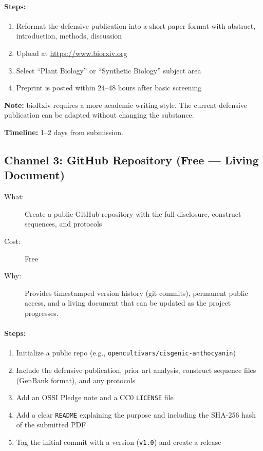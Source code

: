\documentclass[12pt,a4paper]{article}
\begin{document}
\paragraph{Steps:}
\begin{enumerate}
  \item Reformat the defensive publication into a short paper format with abstract, introduction, methods, discussion
  \item Upload at \url{https://www.biorxiv.org}
  \item Select ``Plant Biology'' or ``Synthetic Biology'' subject area
  \item Preprint is posted within 24--48 hours after basic screening
\end{enumerate}

\noindent\textbf{Note:} bioRxiv requires a more academic writing style. The current defensive publication can be adapted without changing the substance.

\noindent\textbf{Timeline:} 1--2 days from submission.

\subsection{Channel 3: GitHub Repository (Free --- Living Document)}

\begin{description}
  \item[What:] Create a public GitHub repository with the full disclosure, construct sequences, and protocols
  \item[Cost:] Free
  \item[Why:] Provides timestamped version history (git commits), permanent public access, and a living document that can be updated as the project progresses.
\end{description}

\paragraph{Steps:}
\begin{enumerate}
  \item Initialize a public repo (e.g., \texttt{opencultivars/cisgenic-anthocyanin})
  \item Include the defensive publication, prior art analysis, construct sequence files (GenBank format), and any protocols
  \item Add an OSSI Pledge note and a CC0 \texttt{LICENSE} file
  \item Add a clear \texttt{README} explaining the purpose and including the SHA-256 hash of the submitted PDF
  \item Tag the initial commit with a version (\texttt{v1.0}) and create a release
\end{enumerate}
\end{document}
